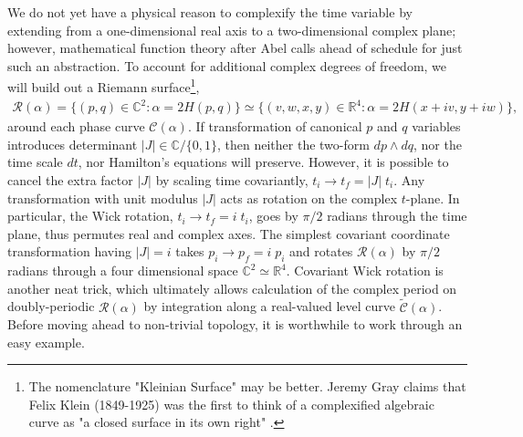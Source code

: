 \documentclass[nofootinbib,preprint]{revtex4-1}
\begin{document}
We do not yet have a physical reason to complexify the time variable by extending from a one-dimensional
real axis to a two-dimensional complex plane; however, mathematical function theory after Abel calls ahead of 
schedule for just such an abstraction. To account for additional complex degrees of freedom, we will build 
out a Riemann surface\footnote{The nomenclature "Kleinian Surface" may be better. Jeremy Gray claims that 
Felix Klein (1849-1925) was the first to think of a complexified algebraic curve as "a closed surface in 
its own right" \cite{GRAY2010}. }, 
\begin{eqnarray}
\mathcal{R}(\alpha) = \{(p,q) \in \mathbb{C}^2: \alpha=2H(p,q) \} 
\simeq \{(v,w,x,y) \in \mathbb{R}^4: \alpha=2H(x+i v,y+i w) \},\nonumber
\end{eqnarray}
around each phase curve $\mathcal{C}(\alpha)$. If transformation of canonical $p$ and $q$ 
variables introduces determinant $|J| \in \mathbb{C}/\{0,1\}$, then neither the two-form 
$dp \wedge dq$, nor the time scale $dt$, nor Hamilton's equations will preserve. However, 
it is possible to cancel the extra factor $|J|$ by scaling time covariantly, 
$t_i \rightarrow t_f = |J|\;t_i$. Any transformation with unit modulus $|J|$ acts as 
rotation on the complex $t$-plane. In particular, the Wick rotation,  
$t_i\rightarrow t_f = i \; t_i$, goes by $\pi/2$ radians through the time plane, 
thus permutes real and complex axes. The simplest covariant coordinate transformation
having $|J|=i$ takes $p_i\rightarrow p_f=i\;p_i$ and rotates $\mathcal{R}(\alpha)$  by 
$\pi/2$ radians through a four dimensional space $\mathbb{C}^2 \simeq \mathbb{R}^4$.
Covariant Wick rotation is another neat trick, which ultimately allows calculation of 
the complex period on doubly-periodic $\mathcal{R}(\alpha)$ by integration along a 
real-valued level curve $\widetilde{\mathcal{C}}(\alpha)$. Before moving ahead to non-trivial 
topology, it is worthwhile to work through an easy example.
\end{document}
